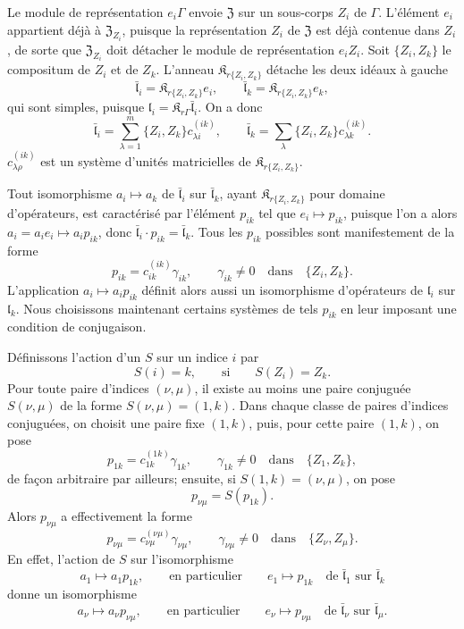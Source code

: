 Le module de représentation \(e_i\Gamma\) envoie \(\mathfrak Z\) sur un sous-corps \(Z_i\) de \(\Gamma\). L'élément \(e_i\) appartient déjà à \(\mathfrak Z_{Z_i}\), puisque la représentation \(Z_i\) de \(\mathfrak Z\) est déjà contenue dans \(Z_i\), de sorte que \(\mathfrak Z_{Z_i}\) doit détacher le module de représentation \(e_iZ_i\). Soit \(\{Z_i,Z_k\}\) le compositum de \(Z_i\) et de \(Z_k\). L'anneau \(\mathfrak K_{r\{Z_i,Z_k\}}\) détache les deux idéaux à gauche
\[
\bar{\mathfrak l}_i=\mathfrak K_{r\{Z_i,Z_k\}}e_i,\qquad
\bar{\mathfrak l}_k=\mathfrak K_{r\{Z_i,Z_k\}}e_k,
\]
qui sont simples, puisque \(\mathfrak l_i=\mathfrak K_{r\Gamma}\bar{\mathfrak l}_i\). On a donc
\[
\bar{\mathfrak l}_i=\sum_{\lambda=1}^m\{Z_i,Z_k\}c_{\lambda i}^{(ik)},\qquad
\bar{\mathfrak l}_k=\sum_{\lambda}\{Z_i,Z_k\}c_{\lambda k}^{(ik)}.
\]
\(c_{\lambda\rho}^{(ik)}\) est un système d'unités matricielles de \(\mathfrak K_{r\{Z_i,Z_k\}}\).

Tout isomorphisme \(a_i\mapsto a_k\) de \(\bar{\mathfrak l}_i\) sur \(\bar{\mathfrak l}_k\), ayant \(\mathfrak K_{r\{Z_i,Z_k\}}\) pour domaine d'opérateurs, est caractérisé par l'élément \(p_{ik}\) tel que \(e_i\mapsto p_{ik}\), puisque l'on a alors \(a_i=a_ie_i\mapsto a_ip_{ik}\), donc \(\bar{\mathfrak l}_i\cdot p_{ik}=\bar{\mathfrak l}_k\). Tous les \(p_{ik}\) possibles sont manifestement de la forme
\[
p_{ik}=c_{ik}^{(ik)}\gamma_{ik},\qquad \gamma_{ik}\ne0\quad\text{dans}\quad \{Z_i,Z_k\}.
\]
L'application \(a_i\mapsto a_ip_{ik}\) définit alors aussi un isomorphisme d'opérateurs de \(\mathfrak l_i\) sur \(\mathfrak l_k\). Nous choisissons maintenant certains systèmes de tels \(p_{ik}\) en leur imposant une condition de conjugaison.

Définissons l'action d'un \(S\) sur un indice \(i\) par
\[
S(i)=k,\qquad\text{si}\qquad S(Z_i)=Z_k.
\]
Pour toute paire d'indices \((\nu,\mu)\), il existe au moins une paire conjuguée \(S(\nu,\mu)\) de la forme \(S(\nu,\mu)=(1,k)\). Dans chaque classe de paires d'indices conjuguées, on choisit une paire fixe \((1,k)\), puis, pour cette paire \((1,k)\), on pose
\[
p_{1k}=c_{1k}^{(1k)}\gamma_{1k},\qquad \gamma_{1k}\ne0\quad\text{dans}\quad \{Z_1,Z_k\},
\]
de façon arbitraire par ailleurs; ensuite, si \(S(1,k)=(\nu,\mu)\), on pose
\[
p_{\nu\mu}=S(p_{1k}).
\]
Alors \(p_{\nu\mu}\) a effectivement la forme
\[
p_{\nu\mu}=c_{\nu\mu}^{(\nu\mu)}\gamma_{\nu\mu},\qquad
\gamma_{\nu\mu}\ne0\quad\text{dans}\quad \{Z_\nu,Z_\mu\}.
\]
En effet, l'action de \(S\) sur l'isomorphisme
\[
a_1\mapsto a_1p_{1k},\qquad\text{en particulier}\qquad e_1\mapsto p_{1k}
\quad\text{de }\bar{\mathfrak l}_1\text{ sur }\bar{\mathfrak l}_k
\]
donne un isomorphisme
\[
a_\nu\mapsto a_\nu p_{\nu\mu},\qquad\text{en particulier}\qquad e_\nu\mapsto p_{\nu\mu}
\quad\text{de }\bar{\mathfrak l}_\nu\text{ sur }\bar{\mathfrak l}_\mu.
\]

